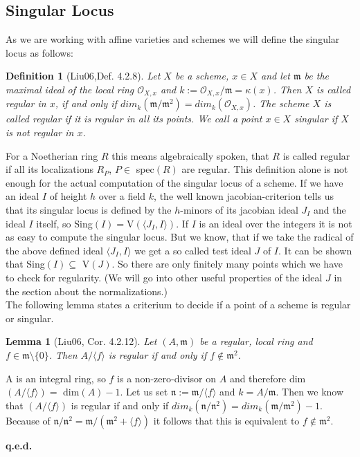 \documentclass{article}
\newtheorem{df}[thm]{Definition}
\newtheorem{lem}[thm]{Lemma}
\newenvironment{proof}%
     {\noindent {\bf Proof:}}{\nopagebreak\begin{flushright}{\bf q.e.d.}\end{flushright}}
\begin{document}
\subsection{Singular Locus}
As we are working with affine varieties and schemes we will define the singular 
locus as follows:

\begin{df}[Liu06,Def. 4.2.8]
Let $X$ be a scheme, $x \in X$ and let $\mathfrak{m}$ be the maximal ideal of the 
local ring $\mathcal{O}_{X,x}$ and $k:=\mathcal{O}_{X,x}/ \mathfrak{m}= \kappa(x)$.
Then $X$ is called regular in $x$, if and only if 
$dim_k( \mathfrak{m}/ \mathfrak{m}^2)=dim_k( \mathcal{O}_{X,x})$. The scheme $X$ is 
called regular if it is regular in all its points. We call a point $x \in X$ 
singular if $X$ is not regular in $x$.
\end{df}

\noindent
For a Noetherian ring $R$ this means algebraically spoken, that $R$ is called 
regular if all its localizations $R_P$, $P\in$ spec$(R)$ are regular.
This definition alone is not enough for the actual computation of the singular 
locus of a scheme. If we have an ideal $I$ of height $h$ over a field $k$,
the well known jacobian-criterion tells us that its singular locus  
is defined by the $h$-minors  of its jacobian ideal $J_I$ and the ideal $I$ 
itself, so Sing$(I)=$V$(\langle J_I,I \rangle)$.
If $I$ is an ideal over the integers it is not as easy to compute the singular 
locus. But we know, that if we take the radical of the above defined ideal 
$\langle J_I,I \rangle$ we get a so called test ideal $J$ of $I$. 
It can be shown that Sing$(I)\subseteq$ V$(J)$. So there are only finitely many 
points which we have to check for regularity.
(We will go into other useful properties of the ideal $J$ in the section about 
the normalizations.)\\
The following lemma states a criterium to decide if a point of a scheme is regular
or singular.

\begin{lem}[Liu06, Cor. 4.2.12]
Let $(A,\mathfrak{m})$ be a regular, local ring and $f \in \mathfrak{m} \setminus \{ 0\}$.
Then $A/\langle f \rangle$ is regular if and only if $f\not\in \mathfrak{m}^2$.
\end{lem}

\begin{proof}
A is an integral ring, so $f$ is a non-zero-divisor on $A$ 
and therefore dim$(A/\langle f \rangle)=$ dim$(A)-1$. 
Let us set $\mathfrak{n}:= \mathfrak{m}/\langle f \rangle$ and $k=A / \mathfrak{m}$. Then 
we know that $(A / \langle f \rangle)$ is regular if and only if 
$dim_k( \mathfrak{n}/ \mathfrak{n}^2) = dim_k( \mathfrak{m}/ \mathfrak{m}^2)-1$. 
Because of $\mathfrak{n}/ \mathfrak{n}^2 = \mathfrak{m}/ (\mathfrak{m}^2 + \langle f \rangle)$
it follows that this is equivalent to $f\not\in \mathfrak{m}^2$.
\end{proof}
\end{document}
